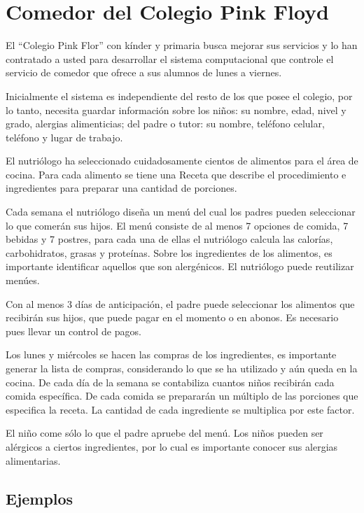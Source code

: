 \documentclass[
  letterpaper,
  DIV=11,
  numbers=noendperiod]{scrreprt}
\begin{document}
\chapter{Comedor del Colegio Pink
Floyd}\label{comedor-del-colegio-pink-floyd}

El ``Colegio Pink Flor'' con kínder y primaria busca mejorar sus
servicios y lo han contratado a usted para desarrollar el sistema
computacional que controle el servicio de comedor que ofrece a sus
alumnos de lunes a viernes.

Inicialmente el sistema es independiente del resto de los que posee el
colegio, por lo tanto, necesita guardar información sobre los niños: su
nombre, edad, nivel y grado, alergias alimenticias; del padre o tutor:
su nombre, teléfono celular, teléfono y lugar de trabajo.

El nutriólogo ha seleccionado cuidadosamente cientos de alimentos para
el área de cocina. Para cada alimento se tiene una Receta que describe
el procedimiento e ingredientes para preparar una cantidad de porciones.

Cada semana el nutriólogo diseña un menú del cual los padres pueden
seleccionar lo que comerán sus hijos. El menú consiste de al menos 7
opciones de comida, 7 bebidas y 7 postres, para cada una de ellas el
nutriólogo calcula las calorías, carbohidratos, grasas y proteínas.
Sobre los ingredientes de los alimentos, es importante identificar
aquellos que son alergénicos. El nutriólogo puede reutilizar menúes.

Con al menos 3 días de anticipación, el padre puede seleccionar los
alimentos que recibirán sus hijos, que puede pagar en el momento o en
abonos. Es necesario pues llevar un control de pagos.

Los lunes y miércoles se hacen las compras de los ingredientes, es
importante generar la lista de compras, considerando lo que se ha
utilizado y aún queda en la cocina. De cada día de la semana se
contabiliza cuantos niños recibirán cada comida específica. De cada
comida se prepararán un múltiplo de las porciones que especifica la
receta. La cantidad de cada ingrediente se multiplica por este factor.

El niño come sólo lo que el padre apruebe del menú. Los niños pueden ser
alérgicos a ciertos ingredientes, por lo cual es importante conocer sus
alergias alimentarias.

\section{Ejemplos}\label{ejemplos-1}
\end{document}
